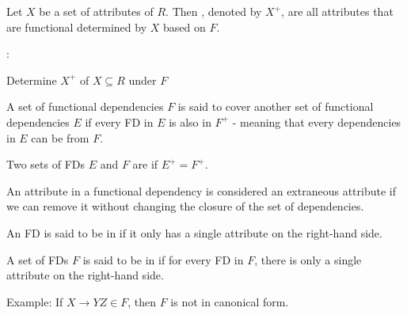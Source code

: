       \par Let $X$ be a set of attributes of $R$. Then , denoted by $X^{+}$, are all attributes that are functional determined by $X$ based on $F$.
      \par {}:
        \begin{algorithm}[H]
          \caption{Determine $X^{+}$ of $X \subseteq R$ under $F$}
        \end{algorithm}

        \par A set of functional dependencies $F$ is said to cover another set of functional dependencies $E$ if every FD in $E$ is also in $F^+$ - meaning that every dependencies in $E$ can be  from $F$.

        \par Two sets of FDs $E$ and $F$ are  if $E^+ = F^+$.

      \par An attribute in a functional dependency is considered an extraneous attribute if we can remove it without changing the closure of the set of dependencies.

      \par An FD is said to be in  if it only has a single attribute on the right-hand side.
      \par A set of FDs $F$ is said to be in  if for every FD in $F$, there is only a single attribute on the right-hand side.
      \par Example: If $X \to YZ \in F$, then $F$ is not in canonical form.

